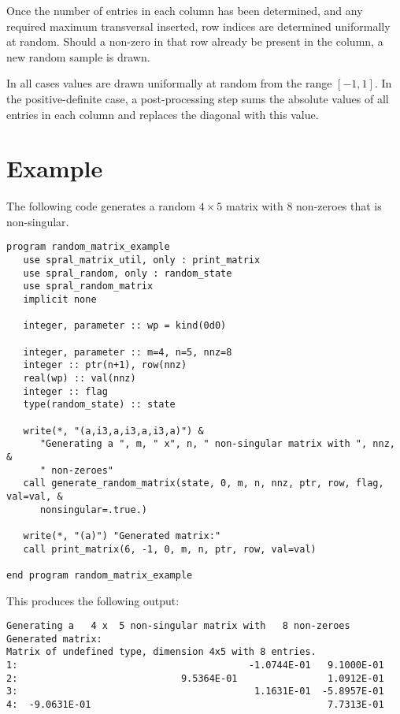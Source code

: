 \documentclass{spral}
\begin{document}
Once the number of entries in each column has been determined, and any required
maximum transversal inserted, row indices are determined uniformally at random.
Should a non-zero in that row already be present in the column, a new random
sample is drawn.

In all cases values are drawn uniformally at random from the range $[-1,1]$. In
the positive-definite case, a post-processing step sums the absolute values of
all entries in each column and replaces the diagonal with this value.


\section{Example} \label{examples}

The following code generates a random $4 \times 5$ matrix with $8$ non-zeroes
that is non-singular.
\begin{verbatim}
program random_matrix_example
   use spral_matrix_util, only : print_matrix
   use spral_random, only : random_state
   use spral_random_matrix
   implicit none

   integer, parameter :: wp = kind(0d0)

   integer, parameter :: m=4, n=5, nnz=8
   integer :: ptr(n+1), row(nnz)
   real(wp) :: val(nnz)
   integer :: flag
   type(random_state) :: state

   write(*, "(a,i3,a,i3,a,i3,a)") &
      "Generating a ", m, " x", n, " non-singular matrix with ", nnz, &
      " non-zeroes"
   call generate_random_matrix(state, 0, m, n, nnz, ptr, row, flag, val=val, &
      nonsingular=.true.)

   write(*, "(a)") "Generated matrix:"
   call print_matrix(6, -1, 0, m, n, ptr, row, val=val)

end program random_matrix_example
\end{verbatim}

This produces the following output:
\begin{verbatim}
Generating a   4 x  5 non-singular matrix with   8 non-zeroes
Generated matrix:
Matrix of undefined type, dimension 4x5 with 8 entries.
1:                                         -1.0744E-01   9.1000E-01
2:                             9.5364E-01                1.0912E-01
3:                                          1.1631E-01  -5.8957E-01
4:  -9.0631E-01                                          7.7313E-01
\end{verbatim}

\begin{funders}
\end{funders}
\end{document}
